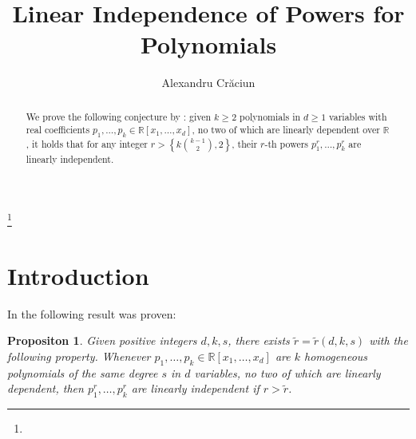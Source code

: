 \documentclass{amsart}
\newtheorem{proposition}[theorem]{Propositon}
\theoremstyle{definition}
\theoremstyle{remark}
\numberwithin{equation}{section}
\newcommand{\R}{\mathbb{R}}
\begin{document}
\title{Linear Independence of Powers for Polynomials}


\author{Alexandru Cr\u aciun}
\address{}
\curraddr{}
\thanks{}


\date{}

\dedicatory{}


\begin{abstract}
	We prove the following conjecture by \cite{Kileel19}: given $ k \ge 2 $
	polynomials in $ d \ge 1 $ variables with real coefficients $ p_1, \ldots,
	p_k \in \R[x_1, \ldots, x_d] $, no two of which are linearly dependent over
	$ \R $, it holds that for any integer $ r > \left\{k \binom{k-1}{2}, 2\right\} $, their $
	r $-th powers $ p_1^r, \ldots, p_k^r $ are linearly independent.
\end{abstract}

\maketitle


\section{Introduction}
\label{section:introduction}

In \cite{Kileel19} the following result was proven:

\begin{proposition}
	\label{prop:kileel}
	Given positive integers $ d,k,s $, there exists $ \tilde{r} = \tilde{r}(d,
	k, s) $ with the following property. Whenever $ p_1, \ldots, p_k \in \R[x_1,
	\ldots, x_d] $ are $ k $ homogeneous polynomials of the same degree
	$ s $ in $ d $ variables, no two of which are linearly dependent, then $
	p_1^r, \ldots, p_k^r $ are linearly independent if $ r > \tilde{r} $.
\end{proposition}
\end{document}
